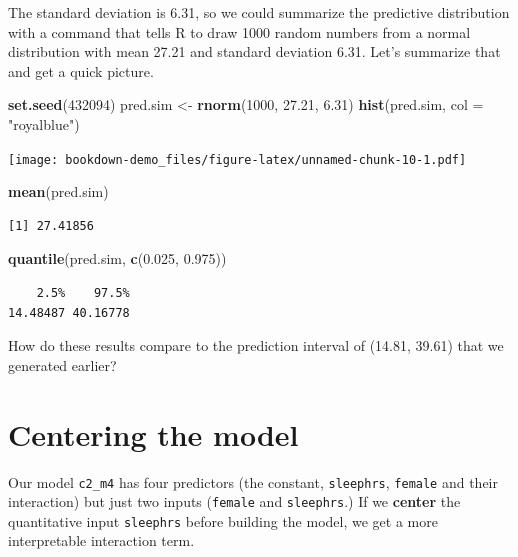 \documentclass[]{book}
\newenvironment{Shaded}{\begin{snugshade}}{\end{snugshade}}
\newcommand{\KeywordTok}[1]{\textcolor[rgb]{0.13,0.29,0.53}{\textbf{#1}}}
\newcommand{\DataTypeTok}[1]{\textcolor[rgb]{0.13,0.29,0.53}{#1}}
\newcommand{\DecValTok}[1]{\textcolor[rgb]{0.00,0.00,0.81}{#1}}
\newcommand{\FloatTok}[1]{\textcolor[rgb]{0.00,0.00,0.81}{#1}}
\newcommand{\StringTok}[1]{\textcolor[rgb]{0.31,0.60,0.02}{#1}}
\newcommand{\NormalTok}[1]{#1}
\theoremstyle{definition}
\theoremstyle{definition}
\theoremstyle{definition}
\theoremstyle{remark}
\begin{document}
The standard deviation is 6.31, so we could summarize the predictive
distribution with a command that tells R to draw 1000 random numbers
from a normal distribution with mean 27.21 and standard deviation 6.31.
Let's summarize that and get a quick picture.

\begin{Shaded}
\begin{Highlighting}[]
\KeywordTok{set.seed}\NormalTok{(}\DecValTok{432094}\NormalTok{)}
\NormalTok{pred.sim <-}\StringTok{ }\KeywordTok{rnorm}\NormalTok{(}\DecValTok{1000}\NormalTok{, }\FloatTok{27.21}\NormalTok{, }\FloatTok{6.31}\NormalTok{)}
\KeywordTok{hist}\NormalTok{(pred.sim, }\DataTypeTok{col =} \StringTok{"royalblue"}\NormalTok{)}
\end{Highlighting}
\end{Shaded}

\texttt{[image: bookdown-demo\_files/figure-latex/unnamed-chunk-10-1.pdf]}

\begin{Shaded}
\begin{Highlighting}[]
\KeywordTok{mean}\NormalTok{(pred.sim)}
\end{Highlighting}
\end{Shaded}

\begin{verbatim}
[1] 27.41856
\end{verbatim}

\begin{Shaded}
\begin{Highlighting}[]
\KeywordTok{quantile}\NormalTok{(pred.sim, }\KeywordTok{c}\NormalTok{(}\FloatTok{0.025}\NormalTok{, }\FloatTok{0.975}\NormalTok{))}
\end{Highlighting}
\end{Shaded}

\begin{verbatim}
    2.5%    97.5% 
14.48487 40.16778 
\end{verbatim}

How do these results compare to the prediction interval of (14.81,
39.61) that we generated earlier?

\section{Centering the model}\label{centering-the-model}

Our model \texttt{c2\_m4} has four predictors (the constant,
\texttt{sleephrs}, \texttt{female} and their interaction) but just two
inputs (\texttt{female} and \texttt{sleephrs}.) If we \textbf{center}
the quantitative input \texttt{sleephrs} before building the model, we
get a more interpretable interaction term.
\end{document}

